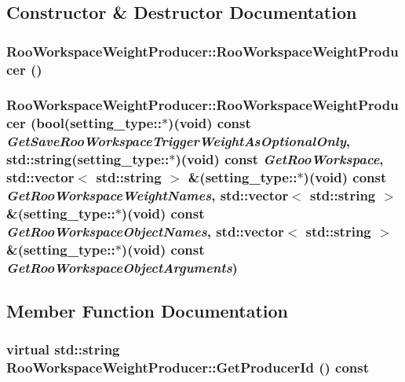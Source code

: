 \subsection{Constructor \& Destructor Documentation}
\hypertarget{classRooWorkspaceWeightProducer_a6a2e96c455f4035cf3c1ecfda323eb78}{
\subsubsection[{RooWorkspaceWeightProducer}]{\setlength{\rightskip}{0pt plus 5cm}RooWorkspaceWeightProducer::RooWorkspaceWeightProducer ()}}
\label{classRooWorkspaceWeightProducer_a6a2e96c455f4035cf3c1ecfda323eb78}
\hypertarget{classRooWorkspaceWeightProducer_a86459d83cde20d84a09f7be5c184ba47}{
\subsubsection[{RooWorkspaceWeightProducer}]{\setlength{\rightskip}{0pt plus 5cm}RooWorkspaceWeightProducer::RooWorkspaceWeightProducer (bool(setting\_\-type::$\ast$)(void) const  {\em GetSaveRooWorkspaceTriggerWeightAsOptionalOnly}, \/  std::string(setting\_\-type::$\ast$)(void) const  {\em GetRooWorkspace}, \/  std::vector$<$ std::string $>$ \&(setting\_\-type::$\ast$)(void) const  {\em GetRooWorkspaceWeightNames}, \/  std::vector$<$ std::string $>$ \&(setting\_\-type::$\ast$)(void) const  {\em GetRooWorkspaceObjectNames}, \/  std::vector$<$ std::string $>$ \&(setting\_\-type::$\ast$)(void) const  {\em GetRooWorkspaceObjectArguments})}}
\label{classRooWorkspaceWeightProducer_a86459d83cde20d84a09f7be5c184ba47}


\subsection{Member Function Documentation}
\hypertarget{classRooWorkspaceWeightProducer_a40f7cc577a5dbf0504fc9f3c1670a0a2}{
\subsubsection[{GetProducerId}]{\setlength{\rightskip}{0pt plus 5cm}virtual std::string RooWorkspaceWeightProducer::GetProducerId () const}}
\label{classRooWorkspaceWeightProducer_a40f7cc577a5dbf0504fc9f3c1670a0a2}


